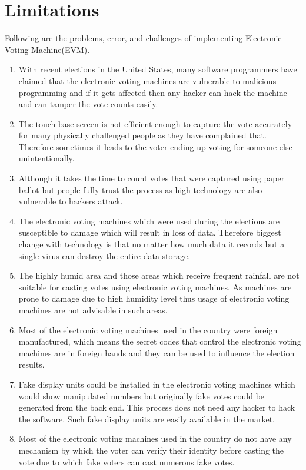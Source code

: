 \section{Limitations}
Following are the problems, error, and challenges of implementing Electronic Voting Machine(EVM)\cite{nikamcritical}.
\begin{enumerate}
\item With recent elections in the United States, many software programmers have claimed that the electronic voting machines are vulnerable to malicious programming and if it gets affected then any hacker can hack the machine and can tamper the vote counts easily.
%
\item The touch base screen is not efficient enough to capture the vote accurately for many physically challenged people as they have complained that. Therefore sometimes it leads to the voter ending up voting for someone else unintentionally.
%
\item Although it takes the time to count votes that were captured using paper ballot but people fully trust the process as high technology are also vulnerable to hackers attack.
%
\item The electronic voting machines which were used during the elections are susceptible to damage which will result in loss of data. Therefore biggest change with technology is that no matter how much data it records but a single virus can destroy the entire data storage.
%
\item The highly humid area and those areas which receive frequent rainfall are not suitable for casting votes using electronic voting machines. As machines are prone to damage due to high humidity level thus usage of electronic voting machines are not advisable in such areas.
%
\item Most of the electronic voting machines used in the country were foreign manufactured, which means the secret codes that control the electronic voting machines are in foreign hands and they can be used to influence the election results.
%
\item Fake display units could be installed in the electronic voting machines which would show manipulated
numbers but originally fake votes could be generated from the back end. This process does not need any hacker
to hack the software. Such fake display units are easily available in the market.
%
\item Most of the electronic voting machines used in the country do not have any mechanism by which the voter can verify their identity before casting the vote due to which fake voters can cast numerous fake votes.

\end{enumerate}

